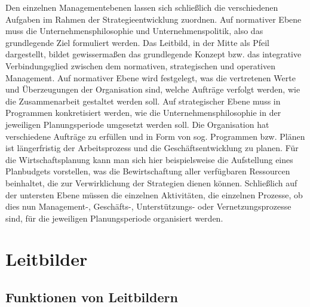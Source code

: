 \documentclass[
  letterpaper,
]{book}
\begin{document}
Den einzelnen Managementebenen lassen sich schließlich die verschiedenen
Aufgaben im Rahmen der Strategieentwicklung zuordnen. Auf normativer
Ebene muss die Unternehmensphilosophie und Unternehmenspolitik, also das
grundlegende Ziel formuliert werden. Das Leitbild, in der Mitte als
Pfeil dargestellt, bildet gewissermaßen das grundlegende Konzept bzw.
das integrative Verbindungsglied zwischen dem normativen, strategischen
und operativen Management. Auf normativer Ebene wird festgelegt, was die
vertretenen Werte und Überzeugungen der Organisation sind, welche
Aufträge verfolgt werden, wie die Zusammenarbeit gestaltet werden soll.
Auf strategischer Ebene muss in Programmen konkretisiert werden, wie die
Unternehmensphilosophie in der jeweiligen Planungsperiode umgesetzt
werden soll. Die Organisation hat verschiedene Aufträge zu erfüllen und
in Form von sog. Programmen bzw. Plänen ist längerfristig der
Arbeitsprozess und die Geschäftsentwicklung zu planen. Für die
Wirtschaftsplanung kann man sich hier beispielsweise die Aufstellung
eines Planbudgets vorstellen, was die Bewirtschaftung aller verfügbaren
Ressourcen beinhaltet, die zur Verwirklichung der Strategien dienen
können. Schließlich auf der untersten Ebene müssen die einzelnen
Aktivitäten, die einzelnen Prozesse, ob dies nun Management-,
Geschäfts-, Unterstützungs- oder Vernetzungsprozesse sind, für die
jeweiligen Planungsperiode organisiert werden.

\section{Leitbilder}\label{leitbilder}

\subsection{Funktionen von
Leitbildern}\label{funktionen-von-leitbildern}
\end{document}
